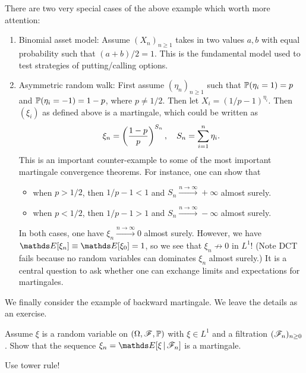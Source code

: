 There are two very special cases of the above example which worth more attention:
\begin{enumerate}
    \item Binomial asset model: Assume $(X_n)_{n\geq 1}$ takes in two values $a,b$ with equal probability such that $(a+b)/2 = 1$. This is the fundamental model used to test strategies of putting/calling options.
    \item Asymmetric random walk: First assume $(\eta_n)_{n\geq 1}$ such that $\mathbb{P}(\eta_i = 1) = p$ and $\mathbb{P}(\eta_i = -1) = 1-p$, where $p \neq 1/2$. Then let $X_i = (1/p - 1)^{\eta_i}$. Then $(\xi_i)$ as defined above is a martingale, which could be written as
    \begin{equation*}
        \xi_n = \left( \frac{1-p}{p} \right)^{S_n}, \quad S_n = \sum_{i=1}^n \eta_i.
    \end{equation*}
    This is an important counter-example to some of the most important martingale convergence theorems. For instance, one can show that 
    \begin{itemize}
        \item when $p > 1/2$, then $1/p - 1 < 1$ and $S_n \overset{n\to\infty}\to +\infty$ almost surely.
        \item when $p < 1/2$, then $1/p - 1 > 1$ and $S_n \overset{n\to\infty}\to -\infty$ almost surely.
    \end{itemize}
    In both cases, one have $\xi_n \overset{n\to\infty}\to 0$ almost surely. However, we have $\E[\xi_n] \equiv \E[\xi_0] = 1$, so we see that $\xi_n \not\to 0$ in $L^1$! (Note DCT fails because no random variables can dominates $\xi_n$ almost surely.) It is a central question to ask whether one can exchange limits and expectations for martingales.
\end{enumerate}

We finally consider the example of backward martingale. We leave the details as an exercise.
\begin{exercise}
Assume $\xi$ is a random variable on $(\Omega,\mathcal{F},\mathbb{P})$ with $\xi \in L^1$ and a filtration $(\mathcal{F}_n)_{n\geq 0}$. Show that the sequence $\xi_n = \E[\xi \,|\, \F_n]$ is a martingale.
\end{exercise}

\begin{hint}
    Use tower rule!
\end{hint}

